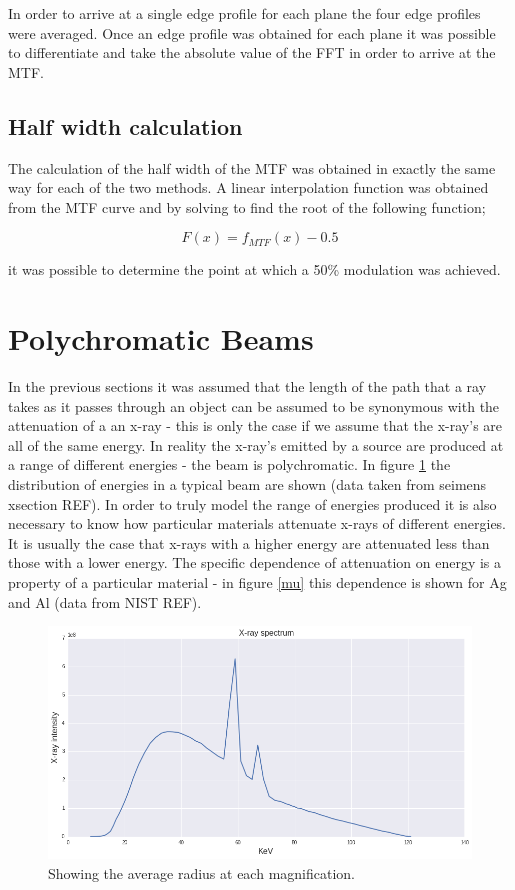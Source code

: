 \documentclass[
  twoside,
  11pt, a4paper,
  footinclude=true,
  headinclude=true,
  cleardoublepage=empty
]{scrbook}
\begin{document}
In order to arrive at a single edge profile for each plane the four edge profiles were averaged. Once an edge profile was obtained for each plane it was possible to differentiate and take the absolute value of the FFT in order to arrive at the MTF.

\subsection{Half width calculation}

The calculation of the half width of the MTF was obtained in exactly the same way for each of the two methods. A linear interpolation function was obtained from the MTF curve and by solving to find the root of the following function;

\[
F(x) = f_{MTF}(x) - 0.5
\]

it was possible to determine the point at which a 50\% modulation was achieved.

\section{Polychromatic Beams}

In the previous sections it was assumed that the length of the path that a ray takes as it passes through an object can be assumed to be synonymous with the attenuation of a an x-ray - this is only the case if we assume that the x-ray's are all of the same energy. In reality the x-ray's emitted by a source are produced at a range of different energies - the beam is polychromatic. In figure \ref{spectrum} the distribution of energies in a typical beam are shown (data taken from seimens xsection REF). In order to truly model the range of energies produced it is also necessary to know how particular materials attenuate x-rays of different energies. It is usually the case that x-rays with a higher energy are attenuated less than those with a lower energy. The specific dependence of attenuation on energy is a property of a particular material - in figure \ref{mu} this dependence is shown for Ag and Al (data from NIST REF).

\begin{figure}[h!]
  \centering
    \includegraphics[width=\textwidth]{figures/spectrum.png}
    \caption{Showing the average radius at each magnification.}
    \label{spectrum}
\end{figure}
\end{document}
